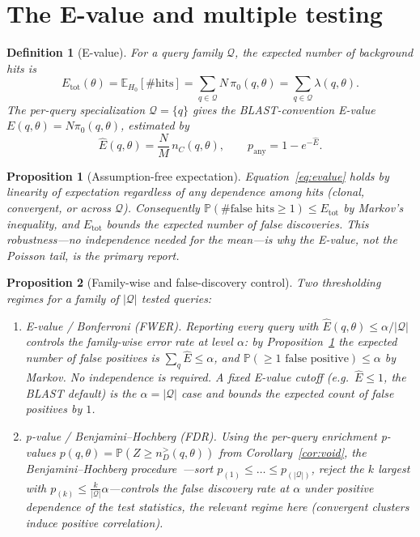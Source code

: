 \documentclass[11pt]{article}
\theoremstyle{oldplain}
\newtheorem{proposition}{Proposition}
\theoremstyle{oldrem}
\newtheorem{definition}{Definition}
\newcommand{\E}{\mathbb{E}}
\newcommand{\Prob}{\mathbb{P}}
\begin{document}
\section{The E-value and multiple testing}\label{sec:evalue}

\begin{definition}[E-value]\label{def:evalue}
For a query family $\mathcal{Q}$, the expected number of background hits is
\begin{equation}\label{eq:evalue}
  E_{\mathrm{tot}}(\theta) = \E_{H_0}[\#\text{hits}] = \sum_{q\in\mathcal{Q}} N\,\pi_0(q,\theta)
  = \sum_{q\in\mathcal{Q}} \lambda(q,\theta).
\end{equation}
The per-query specialization $\mathcal{Q}=\{q\}$ gives the BLAST-convention E-value
$E(q,\theta)=N\pi_0(q,\theta)$, estimated by
\begin{equation}\label{eq:Ehat}
  \widehat E(q,\theta) = \frac{N}{M}\, n_C(q,\theta), \qquad p_{\mathrm{any}} = 1-e^{-\widehat E}.
\end{equation}
\end{definition}

\begin{proposition}[Assumption-free expectation]\label{prop:linearity}
Equation~\eqref{eq:evalue} holds by linearity of expectation regardless of any dependence among
hits (clonal, convergent, or across $\mathcal{Q}$). Consequently $\Prob(\#\text{false hits}\ge 1)\le
E_{\mathrm{tot}}$ by Markov's inequality, and $E_{\mathrm{tot}}$ bounds the expected number of false
discoveries. This robustness---no independence needed for the \emph{mean}---is why the E-value, not
the Poisson tail, is the primary report.
\end{proposition}

\begin{proposition}[Family-wise and false-discovery control]\label{prop:multiple}
Two thresholding regimes for a family of $|\mathcal{Q}|$ tested queries:
\begin{enumerate}
  \item \emph{E-value / Bonferroni (FWER).} Reporting every query with
  $\widehat E(q,\theta)\le\alpha/|\mathcal{Q}|$ controls the family-wise error rate at level $\alpha$:
  by Proposition~\ref{prop:linearity} the expected number of false positives is
  $\sum_q \widehat E \le \alpha$, and $\Prob(\ge 1\text{ false positive})\le\alpha$ by Markov. No
  independence is required. A fixed E-value cutoff (e.g.\ $\widehat E\le 1$, the BLAST default) is the
  $\alpha=|\mathcal{Q}|$ case and bounds the \emph{expected count} of false positives by $1$.
  \item \emph{p-value / Benjamini--Hochberg (FDR).} Using the per-query enrichment p-values
  $p(q,\theta)=\Prob(Z\ge n_D^{>}(q,\theta))$ from Corollary~\ref{cor:void}, the
  Benjamini--Hochberg procedure~\cite{Benjamini1995}---sort $p_{(1)}\le\dots\le p_{(|\mathcal{Q}|)}$,
  reject the $k$ largest with $p_{(k)}\le \tfrac{k}{|\mathcal{Q}|}\alpha$---controls the false
  discovery rate at $\alpha$ under positive dependence of the test statistics, the relevant regime
  here (convergent clusters induce positive correlation).
\end{enumerate}
\end{proposition}
\end{document}
